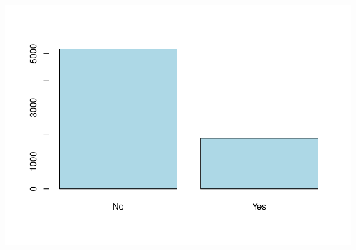 \documentclass[
]{article}
\begin{document}
\includegraphics{Assignment2_script_files/figure-latex/unnamed-chunk-25-1.pdf}
\end{document}
